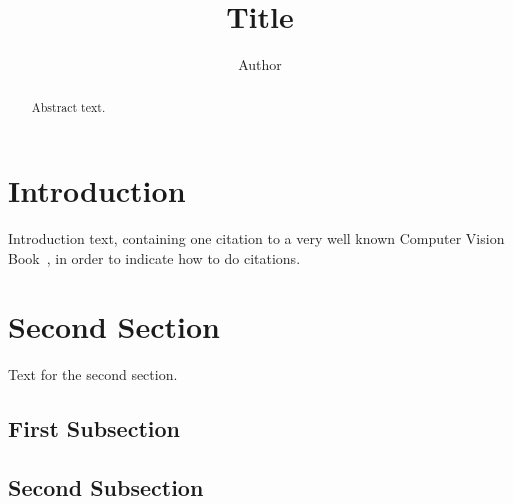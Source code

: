 \documentclass[10pt,twocolumn]{IEEEtran}
\begin{document}
\title{Title}
\author{Author}

\maketitle

\begin{abstract}
Abstract text.
\end{abstract}

\section{Introduction}

Introduction text, containing one citation to a very well known Computer Vision Book~\cite{Hartley00}, in order to indicate how to do citations.

\section{Second Section}

Text for the second section.

\subsection{First Subsection}

\subsection{Second Subsection}




\end{document}
